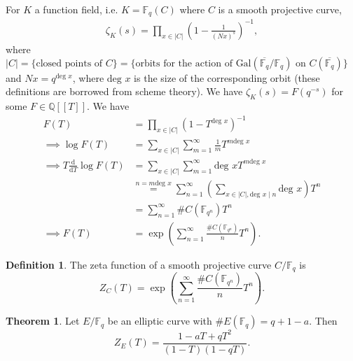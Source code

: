 \documentclass{article}
\theoremstyle{definition}
\newtheorem{theorem}{Theorem}[section]
\newtheorem{defn}{Definition}[section]
\begin{document}
For $K$ a function field, i.e. $K = \mathbb{F}_q(C)$ where $C$ is a smooth projective curve,
\begin{align*}
    \zeta_K(s) = \prod_{x \in \left|C\right|} \left(1-\frac{1}{(Nx)^{s}}\right)^{-1}, 
\end{align*}
where $\left|C\right| = \{\text{closed points of }C\} = \{\text{orbits for the action of Gal}(\overline{\mathbb{F}_q}/\mathbb{F}_q) \text{ on }C(\overline{\mathbb{F}_q})\}$ and $Nx = q^{\text{deg }x}$, where $\text{deg }x$ is the size of the corresponding orbit (these definitions are borrowed from scheme theory). We have $\zeta_K(s) = F(q^{-s})$ for some $F \in \mathbb{Q}[[T]]$. We have
\begin{align*}
    F(T) &= \prod_{x \in \left|C\right|}^{} \left(1-T^{\text{deg }x}\right)^{-1} \\
    \implies \log F(T) &= \sum_{x \in \left|C\right|}^{} \sum_{m=1}^{\infty} \frac{1}{m}T^{m \text{deg }x} \\
    \implies T\frac{\mathrm{d}}{\mathrm{d}T} \log F(T) &= \sum_{x \in \left|C\right|}^{} \sum_{m=1}^{\infty} \text{deg }x T^{m \text{deg }x} \\
    &\stackrel{n = m\text{deg }x}{=} \sum_{n=1}^{\infty} \left(\sum_{x \in \left|C\right|,\text{deg }x \mid n}^{} \text{deg }x \right)T^n \\
    &= \sum_{n=1}^{\infty} \# C(\mathbb{F}_{q^n})T^n \\
    \implies F(T) &= \exp \left(\sum_{n=1}^{\infty} \frac{\# C(\mathbb{F}_{q^n})}{n}T^n \right).
\end{align*}
\begin{defn}
    The zeta function of a smooth projective curve $C/\mathbb{F}_q$ is 
    \[
    Z_C(T) = \exp \left(\sum_{n=1}^{\infty} \frac{\# C(\mathbb{F}_{q^n})}{n}T^n \right).
    \]
\end{defn}
\begin{theorem}\label{theorem7.4}
    Let $E/\mathbb{F}_q$ be an elliptic curve with $\#E(\mathbb{F}_q) = q+1 - a$. Then \[
    Z_E(T) = \frac{1-aT+qT^2}{(1-T)(1-qT)}.
    \]
\end{theorem}
\end{document}
